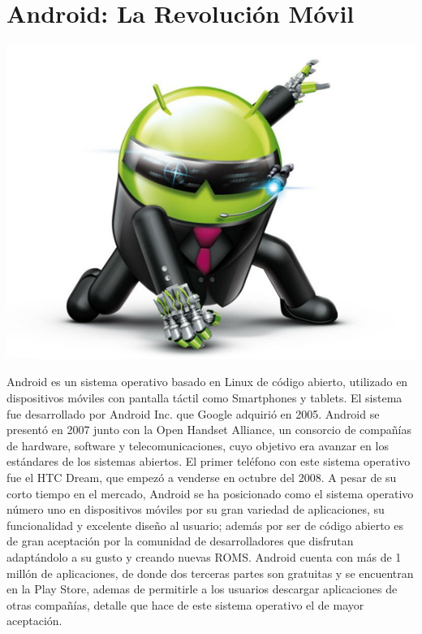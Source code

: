 \chapter*{Android: La Revolución Móvil}

\includegraphics[scale=1]{img/cp05/img0501.png}

Android es un sistema operativo basado en Linux de código abierto, utilizado en dispositivos móviles con pantalla táctil como Smartphones y tablets. El sistema fue 
desarrollado por Android Inc. que Google adquirió en 2005. Android se presentó en 2007 junto con la Open Handset Alliance, un consorcio de compañías de hardware, software y 
telecomunicaciones, cuyo objetivo era avanzar en los estándares de los sistemas abiertos. El primer teléfono con este sistema operativo fue el HTC Dream, que empezó a 
venderse en octubre del 2008. A pesar de su corto tiempo en el mercado, Android se ha posicionado como el sistema operativo número uno en dispositivos móviles por su gran 
variedad de aplicaciones, su funcionalidad y excelente diseño al usuario; además por ser de código abierto es de gran aceptación por la comunidad de desarrolladores que 
disfrutan adaptándolo a su gusto y creando nuevas ROMS. Android cuenta con más de 1 millón de aplicaciones, de donde dos terceras partes son gratuitas y se encuentran en la 
Play Store, ademas de permitirle a los usuarios descargar aplicaciones de otras compañías, detalle que hace de este sistema operativo el de mayor aceptación.



